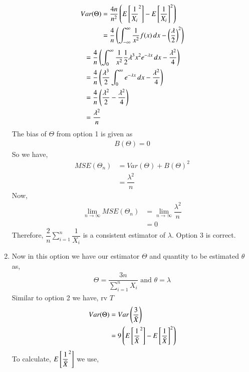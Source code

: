 \documentclass[journal,12pt,twocolumn]{IEEEtran}
\theoremstyle{definition}
\begin{document}
\begin{enumerate}
\begin{align}
 Var(\Theta)   & = \dfrac{4n}{n^2} \left(E  \left[ {\dfrac{1}{X_i}}^2  \right] - {E  \left[ {\dfrac{1}{X_i}}  \right]}^2 \right) \\
    & = \dfrac{4}{n} \left( \int_{-\infty}^{\infty} \dfrac{1}{x^2} f(x)\,dx  - \left(\dfrac{\lambda}{2}\right)^2 \right) 
 \end{align}
 \begin{align}
    & =  \dfrac{4}{n} \left( \int_{0}^{\infty} \dfrac{1}{x^2}  \dfrac{1}{2} \lambda^3x^2e^{-\lambda x} \,dx  - {\dfrac{\lambda^2}{4}} \right) \\
      & =  \dfrac{4}{n} \left( \dfrac{\lambda^3}{2}\int_{0}^{\infty} e^{-\lambda x} \,dx  - {\dfrac{\lambda^2}{4}} \right) \\ 
    & =  \dfrac{4}{n} \left( {\dfrac{\lambda^2}{2}} - {\dfrac{\lambda^2}{4}} \right) \\ 
    &= \dfrac{\lambda^2}{n}
\end{align}
The bias of $ \Theta $ from option 1 is given as
\begin{align}
    B(\Theta) = 0
\end{align}
So we have,
\begin{align}
    MSE(\Theta_n) &= Var(\Theta) + B(\Theta)^2 \\
    &= \dfrac{\lambda^2}{n}
\end{align}
Now,
\begin{align}
     \lim_{n\to\infty} MSE( \Theta_n) &=    \lim_{n\to\infty} \dfrac{\lambda^2}{n} \\
      &= 0
\end{align}
Therefore, $\dfrac{2}{n} \sum_{i=1}^{n} \dfrac{1}{X_i} $ is a consistent estimator of $ \lambda$. 
Option 3 is correct. \\
\item 
 Now in this option we have our estimator $ \Theta$ and quantity to be estimated $ \theta $ as,
 \begin{align}
     \Theta = \dfrac{3n}{\sum_{i=1}^{n} X_i } \text{  and  }
     \theta = \lambda
 \end{align}
 Similar to option 2 we have, rv $ T$
 \begin{align}
     Var(\Theta)&= Var\left(\dfrac{3}{\Bar{X}}\right) \\
     &= 9 \left( E \left[   {\dfrac{1}{\Bar{X}}}^2  \right] - { E \left[   \dfrac{1}{\Bar{X}}  \right]}^2\right)
 \end{align}
 To calculate, $E \left[   {\dfrac{1}{\Bar{X}}}^2  \right] $ we use,
 \begin{align}

\end{align}
\end{enumerate}
\end{document}
